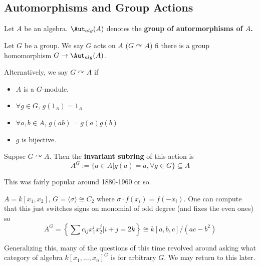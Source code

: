 \documentclass[12pt]{article}
\begin{document}
\subsection{Automorphisms and Group Actions}
Let $A$ be an algebra. $\Aut_{alg}(A)$ denotes the \textbf{group of autormorphisms of $A$.}
\begin{defn}\label{def-action}
	Let $G$ be a group. We say $G$ acts on $A$ ($G\curvearrowright A$) fi there is a group homomorphism
	$G\to \Aut_{alg}(A)$.
\end{defn}
\begin{defn}
	Alternatively, we say $G\curvearrowright A$ if
	\begin{itemize}
		\item $A$ is a $G$-module.
		\item $\forall g\in G$, $g(1_A)=1_A$
		\item $\forall a,b\in A$, $g(ab)=g(a)g(b)$
		\item $g$ is bijective.
	\end{itemize}
\end{defn}
\begin{defn}
	Suppse $G\curvearrowright A$. Then the \textbf{invariant subring} of this action is 
	\[A^G:=\{a\in A|g(a)=a,\forall g\in G\}\subseteq A\]
\end{defn}
This was fairly popular around 1880-1960 or so.
\begin{ex}
	$A=k[x_1,x_2]$, $G=\langle\sigma\rangle\cong C_2$ where
	$\sigma\cdot f(x_i)=f(-x_i)$. One can compute that this just switches signs on monomial 
	of odd degree (and fixes the even ones) so
	\[A^G=\left\{\sum c_{ij}x_1^ix_2^j|i+j=2k\right\}\cong k[a,b,c]/(ac-b^2)\]
\end{ex}
Generalizing this, many of the questions of this time revolved around asking what category of 
algebra $k[x_1,\dots,x_n]^G$ is for arbitrary $G$. We may return to this later.
\end{document}

